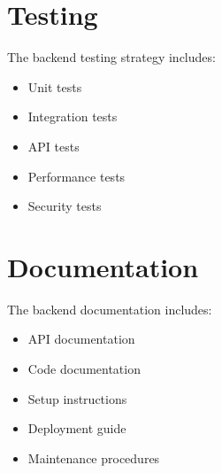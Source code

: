 \section{Testing}
The backend testing strategy includes:
\begin{itemize}
    \item Unit tests
    \item Integration tests
    \item API tests
    \item Performance tests
    \item Security tests
\end{itemize}

\section{Documentation}
The backend documentation includes:
\begin{itemize}
    \item API documentation
    \item Code documentation
    \item Setup instructions
    \item Deployment guide
    \item Maintenance procedures
\end{itemize} 